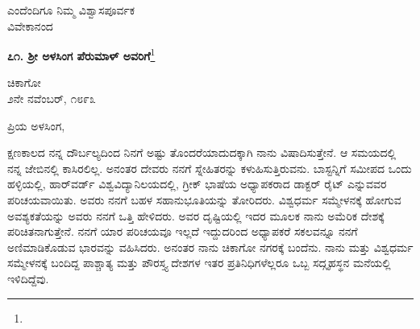 {\flushright
ಎಂದೆಂದಿಗೂ ನಿಮ್ಮ ವಿಶ್ವಾಸಪೂರ್ವಕ\\ವಿವೇಕಾನಂದ\par}


\begin{center}
\textbf{೭೧. ಶ‍್ರೀ ಅಳಸಿಂಗ ಪೆರುಮಾಳ್ ಅವರಿಗೆ}\footnote{}
\end{center}

\vspace{-0.5cm}

\begin{flushright}
ಚಿಕಾಗೋ\\೨ನೇ ನವೆಂಬರ್, ೧೮೯೩
\end{flushright}

\noindent
ಪ್ರಿಯ ಅಳಸಿಂಗ,

ಕ್ಷಣಕಾಲದ ನನ್ನ ದೌರ್ಬಲ್ಯದಿಂದ ನಿನಗೆ ಅಷ್ಟು ತೊಂದರೆಯಾದುದಕ್ಕಾಗಿ ನಾನು ವಿಷಾದಿಸುತ್ತೇನೆ. ಆ ಸಮಯದಲ್ಲಿ ನನ್ನ ಜೇಬಿನಲ್ಲಿ ಕಾಸಿರಲಿಲ್ಲ. ಅನಂತರ ದೇವರು ನನಗೆ ಸ್ನೇಹಿತರನ್ನು ಕಳುಹಿಸುತ್ತಿರುವನು. ಬಾಸ್ಟನ್ನಿಗೆ ಸಮೀಪದ ಒಂದು ಹಳ್ಳಿಯಲ್ಲಿ, ಹಾರ್‌ವರ್ಡ್ ವಿಶ್ವವಿದ್ಯಾನಿಲಯದಲ್ಲಿ, ಗ್ರೀಕ್ ಭಾಷೆಯ ಅಧ್ಯಾಪಕರಾದ ಡಾಕ್ಟರ್ ರೈಟ್ ಎನ್ನುವವರ ಪರಿಚಯವಾಯಿತು. ಅವರು ನನಗೆ ಬಹಳ ಸಹಾನುಭೂತಿಯನ್ನು ತೋರಿದರು. ವಿಶ್ವಧರ್ಮ ಸಮ್ಮೇಳನಕ್ಕೆ ಹೋಗುವ ಅವಶ್ಯಕತೆಯನ್ನು ಅವರು ನನಗೆ ಒತ್ತಿ ಹೇಳಿದರು. ಅವರ ದೃಷ್ಟಿಯಲ್ಲಿ ಇದರ ಮೂಲಕ ನಾನು ಅಮೆರಿಕ ದೇಶಕ್ಕೆ ಪರಿಚಿತನಾಗುತ್ತೇನೆ. ನನಗೆ ಯಾರ ಪರಿಚಯವೂ ಇಲ್ಲದೆ ಇದ್ದುದರಿಂದ ಅಧ್ಯಾಪಕರೆ ಸಕಲವನ್ನೂ ನನಗೆ ಅಣಿಮಾಡಿಕೊಡುವ ಭಾರವನ್ನು ವಹಿಸಿದರು. ಅನಂತರ ನಾನು ಚಿಕಾಗೋ ನಗರಕ್ಕೆ ಬಂದೆನು. ನಾನು ಮತ್ತು ವಿಶ್ವಧರ್ಮ ಸಮ್ಮೇಳನಕ್ಕೆ ಬಂದಿದ್ದ ಪಾಶ್ಚಾತ್ಯ ಮತ್ತು ಪೌರಸ್ತ್ಯ ದೇಶಗಳ ಇತರ ಪ್ರತಿನಿಧಿಗಳೆಲ್ಲರೂ ಒಬ್ಬ ಸದ್ಗೃಹಸ್ಥನ ಮನೆಯಲ್ಲಿ ಇಳಿದಿದ್ದೆವು.

